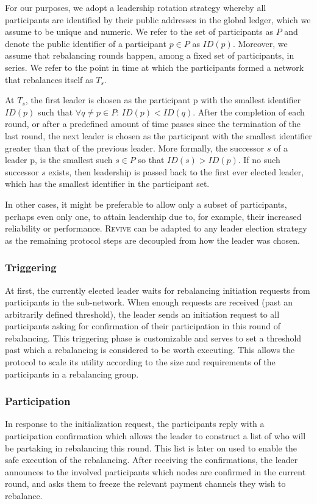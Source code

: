 \documentclass[sigconf]{acmart}
\newcommand{\name}{\textsc{Revive}\xspace}
\begin{document}
For our purposes, we adopt a leadership rotation strategy whereby all participants are identified by their public addresses in the global ledger, which we assume to be unique and numeric. We refer to the set of participants as $P$ and denote the public identifier of a participant $p \in P$ as $ID(p)$. Moreover, we assume that rebalancing rounds happen, among a fixed set of participants, in series. We refer to the point in time at which the participants formed a network that rebalances itself as $T_s$.

At $T_s$, the first leader is chosen as the participant p with the smallest identifier $ID(p)$ such that $\forall q\neq p \in P$:  $ID(p) < ID(q)$. After the completion of each round, or after a predefined amount of time passes since the termination of the last round, the next leader is chosen as the participant with the smallest identifier greater than that of the previous leader. More formally, the successor $s$ of a leader p, is the smallest such $s \in P$ so that $ID(s) > ID(p)$. If no such successor $s$ exists, then leadership is passed back to the first ever elected leader, which has the smallest identifier in the participant set.

In other cases, it might be preferable to allow only a subset of participants, perhaps even only one, to attain leadership due to, for example, their increased reliability or performance. \name can be adapted to any leader election strategy as the remaining protocol steps are decoupled from how the leader was chosen.


\subsubsection{Triggering}

At first, the currently elected leader waits for rebalancing initiation requests from participants in the sub-network. When enough requests are received (past an arbitrarily defined threshold), the leader sends an initiation request to all participants asking for confirmation of their participation in this round of rebalancing.
This triggering phase is customizable and serves to set a threshold past which a rebalancing is considered to be worth executing. This allows the protocol to scale its utility according to the size and requirements of the participants in a rebalancing group.

\subsubsection{Participation}
In response to the initialization request, the participants reply with a participation confirmation which allows the leader to construct a list of who will be partaking in rebalancing this round. This list is later on used to enable the safe execution of the rebalancing.
After receiving the confirmations, the leader announces to the involved participants which nodes are confirmed in the current round, and asks them to freeze the relevant payment channels they wish to rebalance.
\end{document}
